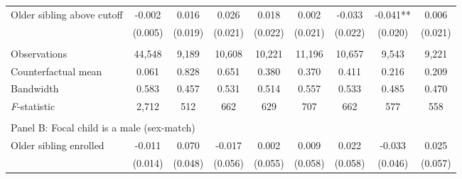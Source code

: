 \begin{table}[!htbp]
{{\begin{tabular}{lcccccccc}
Older sibling above cutoff&      -0.002   &       0.016   &       0.026   &       0.018   &       0.002   &      -0.033   &      -0.041** &       0.006   \\
                    &     (0.005)   &     (0.019)   &     (0.021)   &     (0.022)   &     (0.021)   &     (0.022)   &     (0.020)   &     (0.021)   \\
                    &               &               &               &               &               &               &               &               \\
Observations        &      44,548   &       9,189   &      10,608   &      10,221   &      11,196   &      10,657   &       9,543   &       9,221   \\
Counterfactual mean &       0.061   &       0.828   &       0.651   &       0.380   &       0.370   &       0.411   &       0.216   &       0.209   \\
Bandwidth           &       0.583   &       0.457   &       0.531   &       0.514   &       0.557   &       0.533   &       0.485   &       0.470   \\
\textit{F}-statistic&       2,712   &         512   &         662   &         629   &         707   &         662   &         577   &         558   \\
 
&  &  &  & & & & & \\
\multicolumn{10}{l}{Panel B: Focal child is a male (sex-match)} \\
Older sibling enrolled&      -0.011   &       0.070   &      -0.017   &       0.002   &       0.009   &       0.022   &      -0.033   &       0.025   \\
                    &     (0.014)   &     (0.048)   &     (0.056)   &     (0.055)   &     (0.058)   &     (0.058)   &     (0.046)   &     (0.057)   \\
 

\end{tabular}}}
\end{table}

